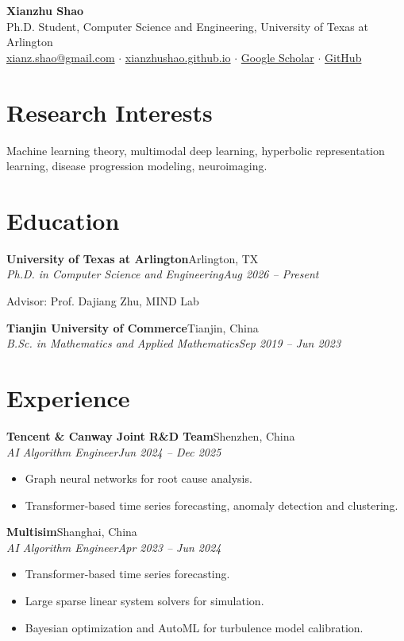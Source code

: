 \documentclass[10pt]{article}
\newcommand{\entry}[4]{\textbf{#1}\hfill #2\\ \textit{#3}\hfill \textit{#4}\par}
\begin{document}
\begin{center}
  {\LARGE\bfseries Xianzhu Shao}\\[4pt]
  Ph.D. Student, Computer Science and Engineering, University of Texas at Arlington\\[2pt]
  \href{mailto:xianz.shao@gmail.com}{xianz.shao@gmail.com} \enspace$\cdot$\enspace
  \href{https://xianzhushao.github.io}{xianzhushao.github.io} \enspace$\cdot$\enspace
  \href{https://scholar.google.com/citations?user=pDls3agAAAAJ}{Google Scholar} \enspace$\cdot$\enspace
  \href{https://github.com/xianzhushao}{GitHub}
\end{center}

\section{Research Interests}
Machine learning theory, multimodal deep learning, hyperbolic representation learning, disease progression modeling, neuroimaging.

\section{Education}
\entry{University of Texas at Arlington}{Arlington, TX}{Ph.D. in Computer Science and Engineering}{Aug 2026 -- Present}
Advisor: Prof. Dajiang Zhu, MIND Lab
\vspace{6pt}

\entry{Tianjin University of Commerce}{Tianjin, China}{B.Sc. in Mathematics and Applied Mathematics}{Sep 2019 -- Jun 2023}

\section{Experience}
\entry{Tencent \& Canway Joint R\&D Team}{Shenzhen, China}{AI Algorithm Engineer}{Jun 2024 -- Dec 2025}
\begin{itemize}
  \item Graph neural networks for root cause analysis.
  \item Transformer-based time series forecasting, anomaly detection and clustering.
\end{itemize}
\vspace{4pt}

\entry{Multisim}{Shanghai, China}{AI Algorithm Engineer}{Apr 2023 -- Jun 2024}
\begin{itemize}
  \item Transformer-based time series forecasting.
  \item Large sparse linear system solvers for simulation.
  \item Bayesian optimization and AutoML for turbulence model calibration.
\end{itemize}
\end{document}
